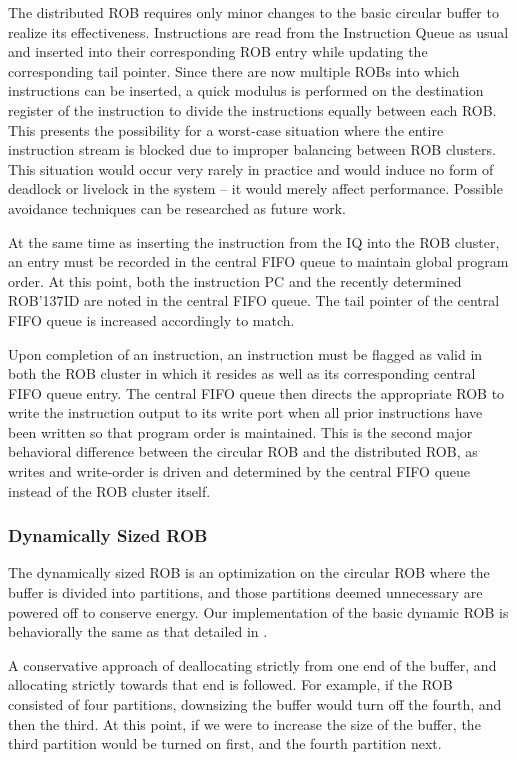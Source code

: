 The distributed ROB requires only minor changes to the basic circular buffer to realize its effectiveness.  Instructions are read from the Instruction Queue as usual and inserted into their corresponding ROB entry while updating the corresponding tail pointer.  Since there are now multiple ROBs into which instructions can be inserted, a quick modulus is performed on the destination register of the instruction to divide the instructions equally between each ROB.  This presents the possibility for a worst-case situation where the entire instruction stream is blocked due to improper balancing between ROB clusters.  This situation would occur very rarely in practice and would induce no form of deadlock or livelock in the system -- it would merely affect performance.  Possible avoidance techniques can be researched as future work.

At the same time as inserting the instruction from the IQ into the ROB cluster, an entry must be recorded in the central FIFO queue to maintain global program order.  At this point, both the instruction PC and the recently determined ROB{\char'137}ID are noted in the central FIFO queue.  The tail pointer of the central FIFO queue is increased accordingly to match.

Upon completion of an instruction, an instruction must be flagged as valid in both the ROB cluster in which it resides as well as its corresponding central FIFO queue entry.  The central FIFO queue then directs the appropriate ROB to write the instruction output to its write port when all prior instructions have been written so that program order is maintained.  This is the second major behavioral difference between the circular ROB and the distributed ROB, as writes and write-order is driven and determined by the central FIFO queue instead of the ROB cluster itself.

\subsubsection{Dynamically Sized ROB}
The dynamically sized ROB is an optimization on the circular ROB where the buffer is divided into partitions, and those partitions deemed unnecessary are powered off to conserve energy. Our implementation of the basic dynamic ROB is behaviorally the same as that detailed in \cite{kucuk2}.

A conservative approach of deallocating strictly from one end of the buffer, and allocating strictly towards that end is followed. For example, if the ROB consisted of four partitions, downsizing the buffer would turn off the fourth, and then the third. At this point, if we were to increase the size of the buffer, the third partition would be turned on first, and the fourth partition next.

